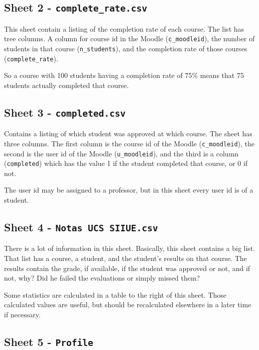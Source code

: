 \subsection{Sheet 2 - \texttt{complete\_rate.csv}}

This sheet contain a listing of the completion rate of each course. The list
has tree columns. A column for course id in the Moodle (\texttt{c\_moodleid}),
the number of students in that course (\texttt{n\_students}), and the
completion rate of those courses (\texttt{complete\_rate}).

So a course with 100 students having a completion rate of 75\% means that 75
students actually completed that course.

\subsection{Sheet 3 - \texttt{completed.csv}}

Contains a listing of which student was approved at which course. The sheet has
three columns. The first column is the course id of the Moodle
(\texttt{c\_moodleid}), the second is the user id of the Moodle
(\texttt{u\_moodleid}), and the third is a column (\texttt{completed}) which
has the value 1 if the student completed that course, or 0 if not.

The user id may be assigned to a professor, but in this sheet every user id is
of a student.

\subsection{Sheet 4 - \texttt{Notas UCS SIIUE.csv}}

There is a lot of information in this sheet. Basically, this sheet contains a
big list. That list has a course, a student, and the student's results on that
course. The results contain the grade, if available, if the student was
approved or not, and if not, why? Did he failed the evaluations or simply
missed them?

Some statistics are calculated in a table to the right of this sheet. Those
calculated values are useful, but should be recalculated elsewhere in a later
time if necessary.

\subsection{Sheet 5 - \texttt{Profile}}


